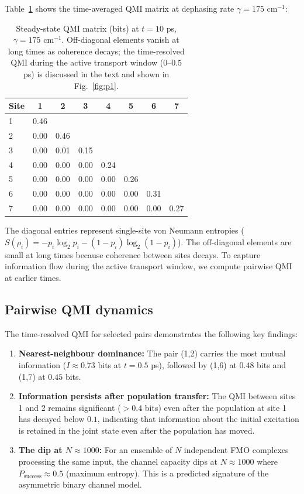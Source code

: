 \documentclass[aps,jcp,twocolumn,showpacs,superscriptaddress]{revtex4-2}
\begin{document}
Table~\ref{tab:qmi} shows the time-averaged QMI matrix at dephasing rate $\gamma = 175$ cm$^{-1}$:

\begin{table}[htbp]
\caption{Steady-state QMI matrix (bits) at $t = 10$ ps, $\gamma = 175$ cm$^{-1}$. Off-diagonal elements vanish at long times as coherence decays; the time-resolved QMI during the active transport window ($0$--$0.5$ ps) is discussed in the text and shown in Fig.~\ref{fig:p1}.}
\label{tab:qmi}
\centering
\begin{tabular}{lccccccc}
\toprule
Site & 1 & 2 & 3 & 4 & 5 & 6 & 7 \\
\midrule
1 & 0.46 & & & & & & \\
2 & 0.00 & 0.46 & & & & & \\
3 & 0.00 & 0.01 & 0.15 & & & & \\
4 & 0.00 & 0.00 & 0.00 & 0.24 & & & \\
5 & 0.00 & 0.00 & 0.00 & 0.00 & 0.26 & & \\
6 & 0.00 & 0.00 & 0.00 & 0.00 & 0.00 & 0.31 & \\
7 & 0.00 & 0.00 & 0.00 & 0.00 & 0.00 & 0.00 & 0.27 \\
\bottomrule
\end{tabular}
\end{table}

The diagonal entries represent single-site von Neumann entropies ($S(\rho_i) = -p_i \log_2 p_i - (1-p_i) \log_2 (1-p_i)$). The off-diagonal elements are small at long times because coherence between sites decays. To capture information flow during the active transport window, we compute pairwise QMI at earlier times.

\subsection{Pairwise QMI dynamics}

The time-resolved QMI for selected pairs demonstrates the following key findings:

\begin{enumerate}
\item \textbf{Nearest-neighbour dominance:} The pair (1,2) carries the most mutual information ($I \approx 0.73$ bits at $t = 0.5$ ps), followed by (1,6) at $0.48$ bits and (1,7) at $0.45$ bits.
\item \textbf{Information persists after population transfer:} The QMI between sites 1 and 2 remains significant ($> 0.4$ bits) even after the population at site 1 has decayed below $0.1$, indicating that information about the initial excitation is retained in the joint state even after the population has moved.
\item \textbf{The dip at $N \approx 1000$:} For an ensemble of $N$ independent FMO complexes processing the same input, the channel capacity dips at $N \approx 1000$ where $P_{\mathrm{success}} \approx 0.5$ (maximum entropy). This is a predicted signature of the asymmetric binary channel model.
\end{enumerate}
\end{document}

